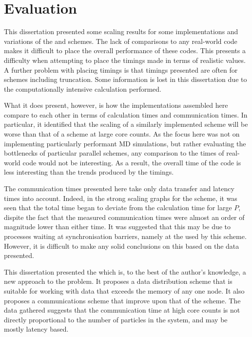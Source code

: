 \section{Evaluation}

This dissertation presented some scaling results for some implementations
and variations of the \replicateddata{} and \systolicloop{} schemes.
%
The lack of comparisons to any real-world code makes it difficult
to place the overall performance of these codes.
%
This presents a difficulty when attempting to place the timings
made in terms of realistic values.
%
A further problem with placing timings is that timings presented
are often for schemes including truncation.
%
Some information is lost in this dissertation due to the computationally
intensive calculation performed.

What it does present, however, is how the implementations assembled here
compare to each other in terms of calculation times and communication times.
%
In particular, it identified that the scaling of a similarly implemented
\systolicloop{} scheme will be worse than that of a \replicateddata{}
scheme at large core counts.
%
As the focus here was not on implementing particularly performant
MD simulations, but rather evaluating the bottlenecks of particular
parallel schemes, any comparison to the times of real-world code
would not be interesting.
%
As a result, the overall time of the code is less interesting than
the trends produced by the timings.

The communication times presented here take only data transfer and
latency times into account.
%
Indeed, in the strong scaling graphs for the \replicatedsystolicloop{}
scheme, it was seen that the total time began to deviate from the
calculation time for large $P$, dispite the fact that the measured
communication times were almost an order of magnitude lower than
either time.
%
It was suggested that this may be due to processes waiting at
synchronisation barriers, namely at the \mpiallreduce{} used
by this scheme.
%
However, it is difficult to make any solid conclusions on this based
on the data presented.

This dissertation presented the \replicatedsystolicloop{} which is,
to the best of the author's knowledge, a new approach to the problem.
%
It proposes a data distribution scheme that is suitable for working
with data that exceeds the memory of any one node.
%
It also proposes a communications scheme that improve upon that
of the \replicateddata{} scheme.
%
The data gathered suggests that the communication time at high core
counts is not directly proportional to the number of particles in
the system, and may be mostly latency based.
